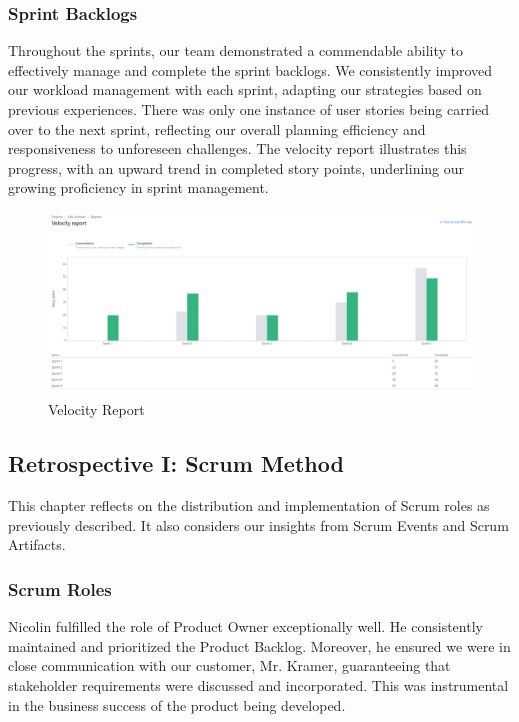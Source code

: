 \subsubsection{Sprint Backlogs}
Throughout the sprints, our team demonstrated a commendable ability to effectively manage and complete the sprint backlogs.
We consistently improved our workload management with each sprint, adapting our strategies based on previous experiences.
There was only one instance of user stories being carried over to the next sprint, reflecting our overall planning efficiency and responsiveness to unforeseen challenges.
The velocity report illustrates this progress, with an upward trend in completed story points, underlining our growing proficiency in sprint management.
\begin{figure}[h!]
    \centering
    \includegraphics[width=1\textwidth]{pictures/Scrum/velocity_report}
    \caption{Velocity Report}
    \label{fig:velocity_report}
\end{figure}

\subsection{Retrospective I: Scrum Method}

This chapter reflects on the distribution and implementation of Scrum roles as previously described.
It also considers our insights from Scrum Events and Scrum Artifacts.

\subsubsection{Scrum Roles}

Nicolin fulfilled the role of Product Owner exceptionally well.
He consistently maintained and prioritized the Product Backlog.
Moreover, he ensured we were in close communication with our customer, Mr. Kramer, guaranteeing that stakeholder requirements were discussed and incorporated.
This was instrumental in the business success of the product being developed.


